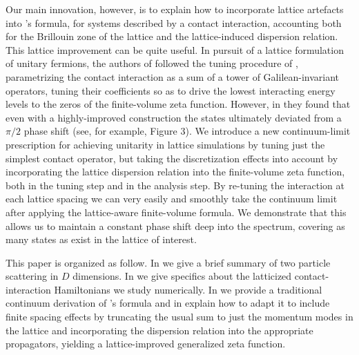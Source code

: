 Our main innovation, however, is to explain how to incorporate lattice artefacts into \Luscher's formula, for systems described by a contact interaction, accounting both for the Brillouin zone of the lattice and the lattice-induced dispersion relation.
This lattice improvement can be quite useful.
In pursuit of a lattice formulation of unitary fermions, the authors of  followed the tuning procedure of , parametrizing the contact interaction as a sum of a tower of Galilean-invariant operators, tuning their coefficients so as to drive the lowest interacting energy levels to the zeros of the \Luscher finite-volume zeta function.
However, in  they found that even with a highly-improved construction the states ultimately deviated from a $\pi/2$ phase shift (see, for example, Figure 3).
We introduce a new continuum-limit prescription for achieving unitarity in lattice simulations by tuning just the simplest contact operator, but taking the discretization effects into account by incorporating the lattice dispersion relation into the finite-volume zeta function, both in the tuning step and in the analysis step.
By re-tuning the interaction at each lattice spacing we can very easily and smoothly take the continuum limit after applying the lattice-aware finite-volume formula.
We demonstrate that this allows us to maintain a constant phase shift deep into the spectrum, covering as many \Aoneg states as exist in the lattice of interest.

This paper is organized as follow.  In  we give a brief summary of two particle scattering in $D$ dimensions.
In  we give specifics about the latticized contact-interaction Hamiltonians we study numerically.
In  we provide a traditional continuum derivation of \Luscher's formula and in  explain how to adapt it to include finite spacing effects by truncating the usual sum to just the momentum modes in the lattice and incorporating the dispersion relation into the appropriate propagators, yielding a lattice-improved generalized \Luscher zeta function.


